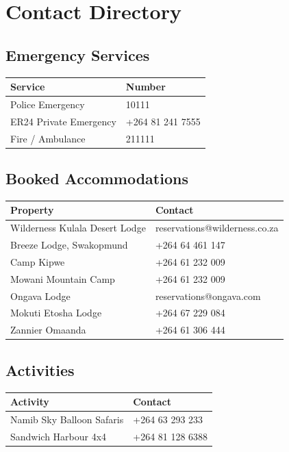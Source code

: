 \documentclass[11pt]{article}
\begin{document}
\clearpage
\section{Contact Directory}

\subsection{Emergency Services}

\begin{tabular}{@{}ll@{}}
\toprule
\textbf{Service} & \textbf{Number} \\
\midrule
Police Emergency & 10111 \\
ER24 Private Emergency & +264 81 241 7555 \\
Fire / Ambulance & 211111 \\
\bottomrule
\end{tabular}

\subsection{Booked Accommodations}

\begin{tabular}{@{}ll@{}}
\toprule
\textbf{Property} & \textbf{Contact} \\
\midrule
Wilderness Kulala Desert Lodge & reservations@wilderness.co.za \\
Breeze Lodge, Swakopmund & +264 64 461 147 \\
Camp Kipwe & +264 61 232 009 \\
Mowani Mountain Camp & +264 61 232 009 \\
Ongava Lodge & reservations@ongava.com \\
Mokuti Etosha Lodge & +264 67 229 084 \\
Zannier Omaanda & +264 61 306 444 \\
\bottomrule
\end{tabular}

\subsection{Activities}

\begin{tabular}{@{}ll@{}}
\toprule
\textbf{Activity} & \textbf{Contact} \\
\midrule
Namib Sky Balloon Safaris & +264 63 293 233 \\
Sandwich Harbour 4x4 & +264 81 128 6388 \\
\bottomrule
\end{tabular}
\end{document}
